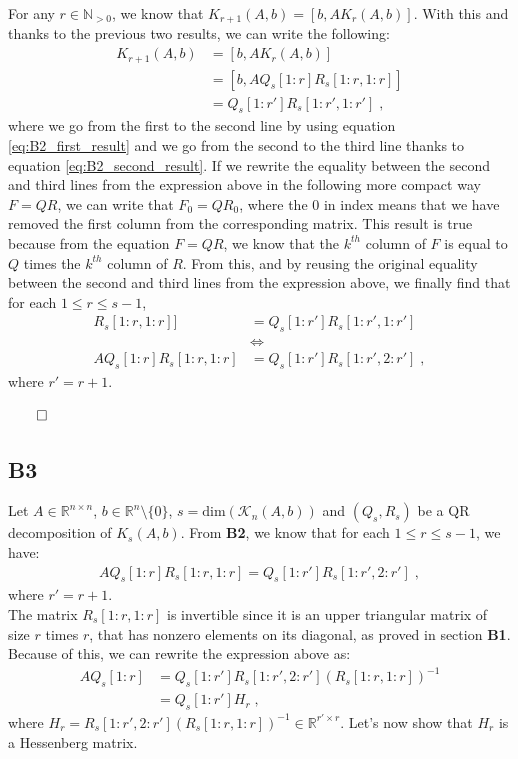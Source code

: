 \documentclass[a4paper,10pt]{article}
\begin{document}
For any $r \in \mathbb{N}_{>0}$, we know that $K_{r+1}(A,b) = [b,A K_r(A,b)]$. With this and thanks to the previous two results, we can write the following:
\begin{align*}
    K_{r+1}(A,b) &= [b,A K_r(A,b)] \\
    &= [b,A Q_s[1:r] R_s[1:r,1:r]] \\
    &= Q_s[1:r'] R_s[1:r',1:r'] \; ,
\end{align*}
where we go from the first to the second line by using equation \ref{eq:B2_first_result} and we go from the second to the third line thanks to equation \ref{eq:B2_second_result}. If we rewrite the equality between the second and third lines from the expression above in the following more compact way $F = QR$, we can write that $F_0 = Q R_0$, where the $0$ in index means that we have removed the first column from the corresponding matrix. This result is true because from the equation $F = QR$, we know that the $k^{th}$ column of $F$ is equal to $Q$ times the $k^{th}$ column of $R$. From this, and by reusing the original equality between the second and third lines from the expression above, we finally find that for each $1 \leq r \leq s-1$,
\begin{align*}
    [b,A Q_s[1:r] R_s[1:r,1:r]] &= Q_s[1:r'] R_s[1:r',1:r'] \\
    &\Longleftrightarrow \\
    A Q_s[1:r] R_s[1:r,1:r] &= Q_s[1:r'] R_s[1:r',2:r'] \; ,
\end{align*}
where $r' = r+1$.
\begin{flushright}
    $\qed$
\end{flushright}



\subsection*{B3}

Let $A \in \mathbb{R}^{n \times n}$, $b \in \mathbb{R}^n \setminus \{0\}$, $s = \text{dim}(\mathcal{K}_n(A,b))$ and $(Q_s,R_s)$ be a QR decomposition of $K_s(A,b)$. From \textbf{B2}, we know that for each $1 \leq r \leq s-1$, we have:
\begin{align*}
    A Q_s[1:r] R_s[1:r,1:r] = Q_s[1:r'] R_s[1:r',2:r'] \; ,
\end{align*}
where $r' = r+1$. \\

The matrix $R_s[1:r,1:r]$ is invertible since it is an upper triangular matrix of size $r$ times $r$, that has nonzero elements on its diagonal, as proved in section \textbf{B1}. Because of this, we can rewrite the expression above as:
\begin{align*}
    A Q_s[1:r] &= Q_s[1:r'] R_s[1:r',2:r'] \displaystyle\left(R_s[1:r,1:r]\right)^{-1} \\
    &= Q_s[1:r'] H_r \; ,
\end{align*}
where $H_r = R_s[1:r',2:r'] \displaystyle\left(R_s[1:r,1:r]\right)^{-1} \in \mathbb{R}^{r' \times r}$. Let's now show that $H_r$ is a Hessenberg matrix. \\
\end{document}
